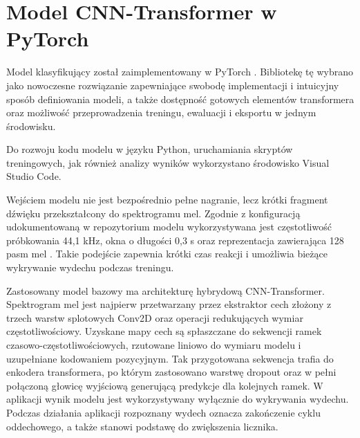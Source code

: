 
\section{Model CNN-Transformer w PyTorch}

Model klasyfikujący został zaimplementowany w PyTorch \cite{pytorchDocs2026}. Bibliotekę tę wybrano jako nowoczesne rozwiązanie zapewniające swobodę implementacji i intuicyjny sposób definiowania modeli, a także dostępność gotowych elementów transformera oraz możliwość przeprowadzenia treningu, ewaluacji i eksportu w jednym środowisku.

Do rozwoju kodu modelu w języku Python, uruchamiania skryptów treningowych, jak również analizy wyników wykorzystano środowisko Visual Studio Code.

Wejściem modelu nie jest bezpośrednio pełne nagranie, lecz krótki fragment dźwięku przekształcony do spektrogramu mel. Zgodnie z konfiguracją udokumentowaną w repozytorium modelu wykorzystywana jest częstotliwość próbkowania 44,1 kHz, okna o długości 0,3 s oraz reprezentacja zawierająca 128 pasm mel \cite{breathingClassificationGithub2026}. Takie podejście zapewnia krótki czas reakcji i umożliwia bieżące wykrywanie wydechu podczas treningu.

Zastosowany model bazowy ma architekturę hybrydową CNN-Transformer. Spektrogram mel jest najpierw przetwarzany przez ekstraktor cech złożony z trzech warstw splotowych Conv2D oraz operacji redukujących wymiar częstotliwościowy. Uzyskane mapy cech są spłaszczane do sekwencji ramek czasowo-częstotliwościowych, rzutowane liniowo do wymiaru modelu i uzupełniane kodowaniem pozycyjnym. Tak przygotowana sekwencja trafia do enkodera transformera, po którym zastosowano warstwę dropout oraz w pełni połączoną głowicę wyjściową generującą predykcje dla kolejnych ramek. W aplikacji wynik modelu jest wykorzystywany wyłącznie do wykrywania wydechu. Podczas działania aplikacji rozpoznany wydech oznacza zakończenie cyklu oddechowego, a także stanowi podstawę do zwiększenia licznika.

